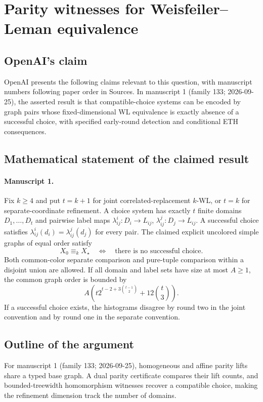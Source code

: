 \documentclass[11pt]{article}
\begin{document}
\section*{Parity witnesses for Weisfeiler–Leman equivalence}

\subsection{OpenAI's claim}
OpenAI presents the following claims relevant to this question, with manuscript numbers following paper order in Sources. In manuscript 1 (family 133; 2026-09-25), the asserted result is that compatible-choice systems can be encoded by graph pairs whose fixed-dimensional WL equivalence is exactly absence of a successful choice, with specified early-round detection and conditional ETH consequences.

\subsection{Mathematical statement of the claimed result}
\paragraph{Manuscript 1.}
Fix $k\ge4$ and put $t=k+1$ for joint correlated-replacement $k$-WL, or $t=k$ for separate-coordinate refinement. A choice system has exactly $t$ finite domains $D_1,\ldots,D_t$ and pairwise label maps $\lambda_{ij}^i:D_i\to L_{ij}$, $\lambda_{ij}^j:D_j\to L_{ij}$. A successful choice satisfies $\lambda_{ij}^i(d_i)=\lambda_{ij}^j(d_j)$ for every pair. The claimed explicit uncolored simple graphs of equal order satisfy
\[
 X_0\equiv_kX_{\star}\quad\Longleftrightarrow\quad\text{there is no successful choice}.
\]
Both common-color separate comparison and pure-tuple comparison within a disjoint union are allowed. If all domain and label sets have size at most $A\ge1$, the common graph order is bounded by
\[
 A\left(t2^{t-2+3\binom{t-1}{2}}+12\binom t3\right).
\]
If a successful choice exists, the histograms disagree by round two in the joint convention and by round one in the separate convention.

\subsection{Outline of the argument}
For manuscript 1 (family 133; 2026-09-25), homogeneous and affine parity lifts share a typed base graph. A dual parity certificate compares their lift counts, and bounded-treewidth homomorphism witnesses recover a compatible choice, making the refinement dimension track the number of domains.
\end{document}

